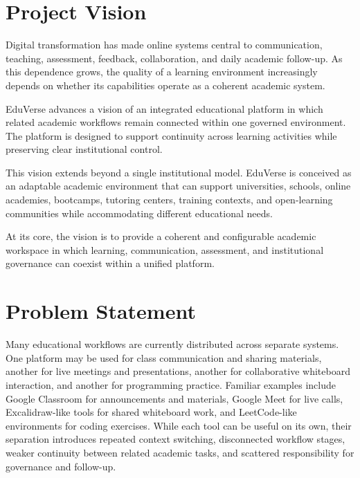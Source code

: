 
\section{Project Vision}\label{sec:project_vision}


Digital transformation has made online systems central to communication, teaching, assessment, feedback, collaboration, and daily academic follow-up. As this dependence grows, the quality of a learning environment increasingly depends on whether its capabilities operate as a coherent academic system.

EduVerse advances a vision of an integrated educational platform in which related academic workflows remain connected within one governed environment. The platform is designed to support continuity across learning activities while preserving clear institutional control.

This vision extends beyond a single institutional model. EduVerse is conceived as an adaptable academic environment that can support universities, schools, online academies, bootcamps, tutoring centers, training contexts, and open-learning communities while accommodating different educational needs.

At its core, the vision is to provide a coherent and configurable academic workspace in which learning, communication, assessment, and institutional governance can coexist within a unified platform.


\section{Problem Statement}\label{sec:problem_statement}

Many educational workflows are currently distributed across separate systems.
One platform may be used for class communication and sharing materials, another
for live meetings and presentations, another for collaborative whiteboard
interaction, and another for programming practice. Familiar examples include
Google Classroom for announcements and materials, Google Meet for live calls,
Excalidraw-like tools for shared whiteboard work, and LeetCode-like
environments for coding exercises. While each tool can be useful on its own,
their separation introduces repeated context switching, disconnected workflow stages, weaker continuity between related academic tasks, and scattered
responsibility for governance and follow-up.

